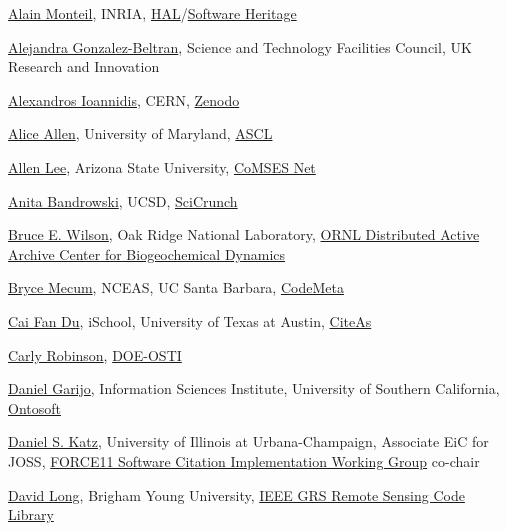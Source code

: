 \documentclass[11pt]{article}
\begin{document}
\begin{spacing}{0.86}

\href{https://orcid.org/0000-0003-3150-4837}{Alain Monteil}, INRIA, \href{https://hal.archives-ouvertes.fr/}{HAL}/\href{https://www.softwareheritage.org/}{Software Heritage}

\href{https://orcid.org/0000-0003-3499-8262}{Alejandra Gonzalez-Beltran}, Science and Technology Facilities Council, UK Research and Innovation

\href{https://orcid.org/0000-0002-5082-6404}{Alexandros Ioannidis}, CERN, \href{https://zenodo.org/}{Zenodo}

\href{https://orcid.org/0000-0003-3477-2845}{Alice Allen}, University of Maryland, \href{http://ascl.net/}{ASCL}

\href{https://orcid.org/0000-0002-6523-6079}{Allen Lee}, Arizona State University, \href{https://www.comses.net/}{CoMSES Net}

\href{https://orcid.org/0000-0002-5497-0243}{Anita Bandrowski}, UCSD, \href{https://scicrunch.org/}{SciCrunch}

\href{https://orcid.org/0000-0002-1421-1728}{Bruce E. Wilson}, Oak Ridge National Laboratory, \href{https://daac.ornl.gov/}{ORNL Distributed Active Archive Center for Biogeochemical Dynamics}

\href{https://orcid.org/0000-0002-0381-3766}{Bryce Mecum}, NCEAS, UC Santa Barbara, \href{https://codemeta.github.io/}{CodeMeta}

\href{https://orcid.org/0000-0003-2538-607X}{Cai Fan Du}, iSchool, University of Texas at Austin, \href{http://citeas.org/}{CiteAs}

\href{https://orcid.org/0000-0002-8523-1478}{Carly Robinson}, \href{https://www.osti.gov/}{DOE-OSTI}

\href{http://orcid.org/0000-0003-0454-7145}{Daniel Garijo}, Information Sciences Institute, University of Southern
California, \href{http://www.ontosoft.org/}{Ontosoft}

\href{https://orcid.org/0000-0001-5934-7525}{Daniel S. Katz}, University of Illinois at Urbana-Champaign, Associate
EiC for JOSS, \href{https://www.force11.org/group/software-citation-implementation-working-group}{FORCE11 Software Citation Implementation Working Group} co-chair

\href{https://orcid.org/0000-0002-1852-3972}{David Long}, Brigham Young University, \href{https://rscl-grss.org/}{IEEE GRS Remote Sensing Code Library}


\end{spacing}
\end{document}
